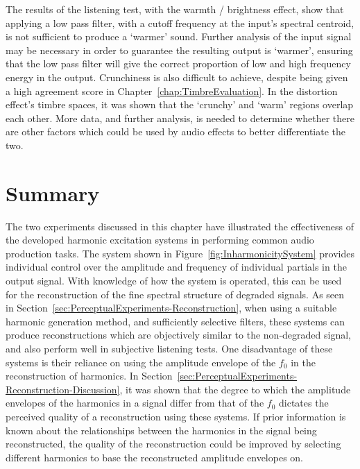 		The results of the listening test, with the warmth / brightness effect, show that applying a low pass
		filter, with a cutoff frequency at the input's spectral centroid, is not sufficient to produce a `warmer'
		sound.  Further analysis of the input signal may be necessary in order to guarantee the resulting output is
		`warmer', ensuring that the low pass filter will give the correct proportion of low and high frequency
		energy in the output. Crunchiness is also difficult to achieve, despite being given a high agreement score
		in Chapter~\ref{chap:TimbreEvaluation}. In the distortion effect's timbre spaces, it was shown that the
		`crunchy' and `warm' regions overlap each other. More data, and further analysis, is needed to determine
		whether there are other factors which could be used by audio effects to better differentiate the two.

\section{Summary}
\label{sec:PerceptualExperiments-Summary}
	The two experiments discussed in this chapter have illustrated the effectiveness of the developed harmonic
	excitation systems in performing common audio production tasks.  The system shown in
	Figure~\ref{fig:InharmonicitySystem} provides individual control over the amplitude and frequency of individual
	partials in the output signal. With knowledge of how the system is operated, this can be used for the
	reconstruction of the fine spectral structure of degraded signals. As seen in
	Section~\ref{sec:PerceptualExperiments-Reconstruction}, when using a suitable harmonic generation method, and
	sufficiently selective filters, these systems can produce reconstructions which are objectively similar to the
	non-degraded signal, and also perform well in subjective listening tests. One disadvantage of these systems is
	their reliance on using the amplitude envelope of the $f_{0}$ in the reconstruction of harmonics. In
	Section~\ref{sec:PerceptualExperiments-Reconstruction-Discussion}, it was shown that the degree to which the
	amplitude envelopes of the harmonics in a signal differ from that of the $f_{0}$ dictates the perceived quality of
	a reconstruction using these systems. If prior information is known about the relationships between the harmonics
	in the signal being reconstructed, the quality of the reconstruction could be improved by selecting different
	harmonics to base the reconstructed amplitude envelopes on.

